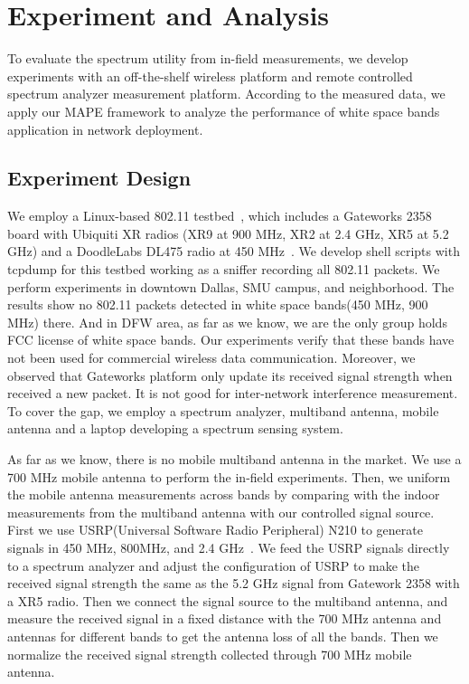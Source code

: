 \section{Experiment and Analysis}
\label{sec:experimentdesign}
To evaluate the spectrum utility from in-field measurements, we develop experiments 
with an off-the-shelf wireless platform and remote controlled spectrum analyzer
measurement platform.
According to the measured data, we apply our MAPE framework to analyze the performance 
of white space bands application in network deployment.

\subsection{Experiment Design}
We employ a Linux-based 802.11 testbed~\cite{Gateworks},
which includes a Gateworks 2358 board with Ubiquiti XR radios (XR9 at 900 MHz, 
XR2 at 2.4 GHz, XR5 at 5.2 GHz) and a DoodleLabs DL475 radio at 450 MHz~\cite{Ubnt,Gateworks}.
We develop shell scripts with tcpdump for this testbed working as a sniffer recording all 
802.11 packets.
We perform experiments in downtown Dallas, SMU campus, and neighborhood. The results show
no 802.11 packets detected in white space bands(450 MHz, 900 MHz) there. 
And in DFW area, as 
far as we know, we are the only group holds FCC license of white space bands. 
Our experiments verify that these bands have not been used for commercial wireless data communication.
Moreover, we observed that Gateworks platform only update its received signal strength when received
a new packet.
It is not good for inter-network interference measurement. To cover the gap,
we employ a spectrum analyzer, multiband antenna, mobile antenna and a laptop developing
a spectrum sensing system.

As far as we know, there is no mobile multiband antenna in the market. We use a 700 MHz
mobile antenna to perform the in-field experiments. 
Then, we uniform the mobile antenna 
measurements across bands by comparing with the indoor measurements from the multiband antenna
with our controlled signal source. First we use USRP(Universal Software Radio Peripheral) 
N210 to generate signals in 450 MHz, 800MHz, and 2.4 GHz~\cite{usrp}. We feed the USRP 
signals directly to a spectrum analyzer and adjust the configuration of USRP to make
the received signal strength the same as the 5.2 GHz signal from Gatework 2358 with 
a XR5 radio. Then we connect the signal source to the multiband antenna, and measure the 
received signal in a fixed distance with the 700 MHz antenna and antennas for different bands
to get the antenna loss of all the bands. Then we normalize the received signal strength 
collected through 700 MHz mobile antenna.

